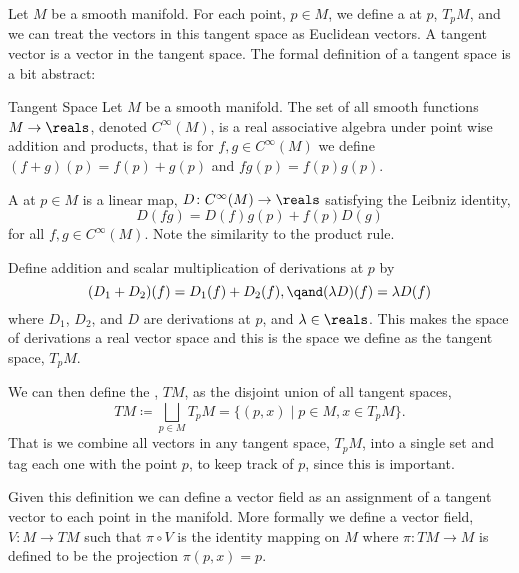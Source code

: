 \documentclass[fleqn]{NotesClass}
\begin{document}
    Let \(M\) be a smooth manifold.
    For each point, \(p \in M\), we define a  at \(p\), \(T_pM\), and we can treat the vectors in this tangent space as Euclidean vectors.
    A tangent vector is a vector in the tangent space.
    The formal definition of a tangent space is a bit abstract:
    \begin{dfn}{Tangent Space}{}
        Let \(M\) be a smooth manifold.
        The set of all smooth functions \(M \to \reals\), denoted \(C^{\infty}(M)\), is a real associative algebra under point wise addition and products, that is for \(f, g \in C^{\infty}(M)\) we define \((f + g)(p) = f(p) + g(p)\) and \(fg(p) = f(p)g(p)\).
        
        A  at \(p \in M\) is a linear map, \(D \colon C^{\infty}(M) \to \reals\) satisfying the Leibniz identity,
        \begin{equation}
            D(fg) = D(f)g(p) + f(p)D(g)
        \end{equation}
        for all \(f, g \in C^{\infty}(M)\).
        Note the similarity to the product rule.
        
        Define addition and scalar multiplication of derivations at \(p\) by
        \begin{equation}
            (D_1 + D_2)(f) = D_1(f) + D_2(f), \qand (\lambda D)(f) = \lambda D(f)
        \end{equation}
        where \(D_1\), \(D_2\), and \(D\) are derivations at \(p\), and \(\lambda \in \reals\).
        This makes the space of derivations a real vector space and this is the space we define as the tangent space, \(T_pM\).
        
        We can then define the , \(TM\), as the disjoint union of all tangent spaces,
        \begin{equation}
            TM \coloneqq \bigsqcup_{p \in M} T_pM = \{(p, x) \mid p \in M, x \in T_pM\}.
        \end{equation}
        That is we combine all vectors in any tangent space, \(T_pM\), into a single set and tag each one with the point \(p\), to keep track of \(p\), since this is important.
    \end{dfn}
    
    Given this definition we can define a vector field as an assignment of a tangent vector to each point in the manifold.
    More formally we define a vector field, \(V \colon M \to TM\) such that \(\pi \circ V\) is the identity mapping on \(M\) where \(\pi \colon TM \to M\) is defined to be the projection \(\pi(p, x) = p\).
    
\end{document}
